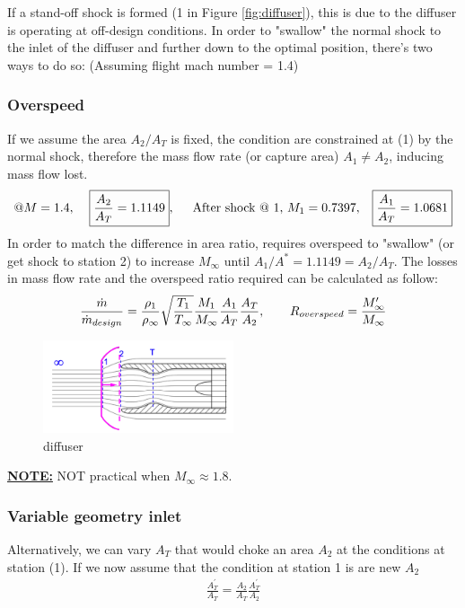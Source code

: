 \documentclass[a4paper,10pt]{article}
\begin{document}
If a stand-off shock is formed (1 in Figure \ref{fig:diffuser}), this is due to the diffuser is operating at off-design conditions. In order to "swallow" the normal shock to the inlet of the diffuser and further down to the optimal position, there's two ways to do so: (Assuming flight mach number = 1.4)

\subsubsection{Overspeed}
If we assume the area $A_2/A_T$ is fixed, the condition are constrained at (1) by the normal shock, therefore the mass flow rate (or capture area) $A_1\neq A_2$, inducing mass flow lost. 
\begin{gather*}
    @M=1.4,\hspace*{0.4cm}\boxed{\frac{A_2}{A_T} = 1.1149},\hspace*{0.5cm}\text{After shock @ 1, }M_1=0.7397,\hspace*{0.3cm}\boxed{\frac{A_1}{A_T} = 1.0681}
\end{gather*}
In order to match the difference in area ratio, requires overspeed to "swallow" (or get shock to station 2) to increase $M_\infty$ until $A_1/A^* = 1.1149=A_2/A_T$. The losses in mass flow rate and the overspeed ratio required can be calculated as follow:
\begin{gather*}
    \frac{\dot{m}}{\dot{m}_{design}} = \frac{\rho_1}{\rho_\infty}\sqrt{\frac{T_1}{T_\infty}}\frac{M_1}{M_\infty}\frac{A_1}{A_T}\frac{A_T}{A_2},\hspace*{0.7cm}R_{overspeed} = \frac{M_\infty^{\prime}}{M_\infty}
\end{gather*}
\begin{figure}[H]
    \centering
    \includegraphics[width=0.5\textwidth]{Figure/diffuser.png}
    \caption{diffuser}
    \label{fig:diffus  er}
\end{figure}
\vspace*{-0.3cm}
\underline{\textbf{NOTE:}} NOT practical when $M_\infty\approx1.8$.

\subsubsection{Variable geometry inlet}
Alternatively, we can vary $A_T$ that would choke an area $A_2$ at the conditions at station (1). If we now assume that the condition at station 1 is are new $A_2$
\begin{gather*}
    \frac{A_T^{\prime}}{A_T} = \frac{A_2}{A_T}\frac{A_T^{\prime}}{A_2}
\end{gather*}
\end{document}
